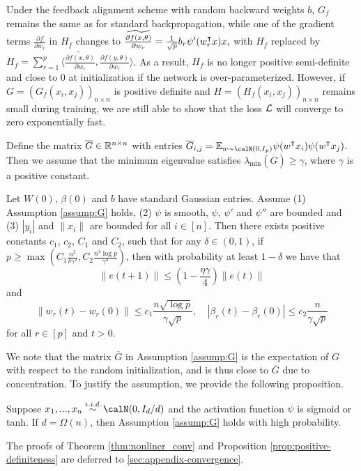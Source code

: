 Under the feedback alignment scheme with random backward weights $b$, $G_f$ remains the same as for standard backpropagation, while one of the gradient terms $\frac{\partial f}{\partial w_r}$ in $H_f$ changes to
$\widetilde{\frac{\partial f(x, \theta)}{\partial w_r}}   = \frac{1}{\sqrt{p}} b_r \psi'(w_r\transpose x)x,
$
with $H_f$ replaced by $H_f = \sum_{r=1}^p\Big\langle \widetilde{\frac{\partial f (x,\theta)}{\partial w_r}},\frac{\partial f (y,\theta)}{\partial w_r}\Big\rangle$.
As a result, $H_f$ is no longer positive semi-definite and close to $0$ at initialization if the network is over-parameterized. However, if $G = (G_f(x_i,x_j))_{n\times n}$ is positive definite and $H = (H_f(x_i,x_j))_{n\times n}$ remains small during training, we are still able to show that the loss $\mathcal{L}$ will converge to zero exponentially fast.

\begin{assumption}\label{assump:G}
Define the matrix $\overline{G} \in \mathbb{R}^{n\times n}$ with entries
$\overline{G}_{i,j} = \E_{w\sim \calN(0,I_p)}\psi(w\transpose x_i) \psi(w\transpose  x_j)$.
Then we assume that the minimum eigenvalue satisfies $\lambda_{\min}(\overline{G}) \geq \gamma$, where $\gamma$ is a positive constant.
\end{assumption}
\vskip5pt

\begin{theorem}\label{thm:nonliner_conv}
Let $W(0)$, $\beta(0)$ and $b$ have \iid standard Gaussian entries. Assume \textnormal{(1)} Assumption \ref{assump:G} holds, \textnormal{(2)} $\psi$ is smooth, $\psi$, $\psi'$ and $\psi''$ are bounded and \textnormal{(3)} $|y_i|$ and $\|x_i\|$ are bounded for all $i\in[n]$. Then there exists positive constants $c_1$, $c_2$, $C_1$ and $C_2$, such that for any $\delta\in(0,1)$, if $p \geq \max\left(C_1\frac{n^2}{\delta\gamma^2}, C_2\frac{n^4\log p}{\gamma^4}\right)$, then with probability at least $1-\delta$ we have that
\begin{equation}\label{eq:conv}
    \|e(t+1)\| \leq (1-\frac{\eta\gamma}{4})\|e(t)\|
\end{equation}
and
\begin{equation}
\label{eq:weights}
    \|w_r(t)-w_r(0)\| \leq c_1\frac{n\sqrt{\log p}}{\gamma\sqrt p}, \quad |\beta_r(t)-\beta_r(0)| \leq c_2\frac{n}{\gamma\sqrt p}
\end{equation}
for all $r\in[p]$ and $t>0$.
\end{theorem}

We note that the matrix $\overline{G}$ in Assumption \ref{assump:G} is the expectation of $G$ with respect to the random initialization, and is thus close to $\overline{G}$ due to concentration. To justify the assumption, we provide the following proposition.

\begin{proposition}\label{prop:positive-definiteness}
Suppose $x_1,...,x_n \overset{\iid}{\sim} \calN(0,I_d/d)$ and the activation function $\psi$ is sigmoid or tanh. If $d=\Omega(n)$, then Assumption \ref{assump:G} holds with high probability.
\end{proposition}

\noindent
The proofs of Theorem \ref{thm:nonliner_conv} and Proposition \ref{prop:positive-definiteness} are deferred to \cref{sec:appendix-convergence}.
